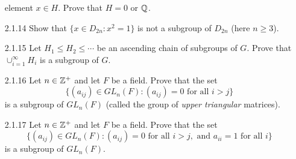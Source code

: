 \begin{enumerate}
                  element $x \in H$. Prove that $H = 0$ or $\mathbb{Q}$.
   \item[2.1.14]  Show that $\{x \in D_{2n} : x^2 = 1\}$ is not a subgroup of
                  $D_{2n}$ (here $n \ge 3$).
   \item[2.1.15]  Let $H_1 \le H_2 \le \cdots$ be an ascending chain of
                  subgroups of $G$. Prove that $\cup_{i=1}^\infty H_i$ is a 
                  subgroup of $G$.
   \item[2.1.16]  Let $n \in \mathbb{Z}^+$ and let $F$ be a field. Prove that the set
                  $$\{(a_{ij}) \in GL_n(F) : (a_{ij}) = 0 \text{ for all }
                     i > j\}$$
                  is a subgroup of $GL_n(F)$ (called the group of
                  \textit{upper triangular} matrices).
   \item[2.1.17]  Let $n \in \mathbb{Z}^+$ and let $F$ be a field. Prove that the set
                  $$\{(a_{ij}) \in GL_n(F) : (a_{ij}) = 0 \text{ for all }
                      i > j, \text{ and } a_{ii} = 1 \text{ for all }i\}$$
                  is a subgroup of $GL_n(F)$.
\end{enumerate}
